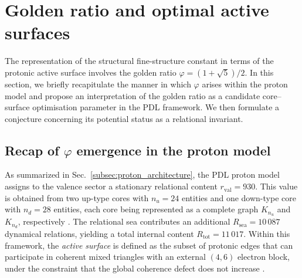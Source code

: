 \documentclass[11pt,a4paper]{article}
\numberwithin{equation}{section}
\begin{document}
\section{Golden ratio and optimal active surfaces}
\label{sec:golden_ratio}

The representation of the structural fine-structure constant in terms of the protonic active surface involves the golden ratio $\varphi=(1+\sqrt{5})/2$. In this section, we briefly recapitulate the manner in which $\varphi$ arises within the proton model and propose an interpretation of the golden ratio as a candidate core–surface optimisation parameter in the PDL framework. We then formulate a conjecture concerning its potential status as a relational invariant.

\subsection{Recap of \texorpdfstring{$\varphi$}{phi} emergence in the proton model}
\label{subsec:phi_recap}

As summarized in Sec.~\ref{subsec:proton_architecture}, the PDL proton model assigns to the valence sector a stationary relational content $r_{\mathrm{val}}=930$. This value is obtained from two up-type cores with $n_u=24$ entities and one down-type core with $n_d=28$ entities, each core being represented as a complete graph $K_{n_u}$ and $K_{n_d}$, respectively \cite{LaubscherPDLFull2026,LaubscherLDP2026,LaubscherCombinatorialProton2026}. The relational sea contributes an additional $R_{\mathrm{sea}}=10\,087$ dynamical relations, yielding a total internal content $R_{\mathrm{tot}}=11\,017$. Within this framework, the \emph{active surface} is defined as the subset of protonic edges that can participate in coherent mixed triangles with an external $(4,6)$ electron block, under the constraint that the global coherence defect does not increase \cite{LaubscherDerivationAlpha2026,LaubscherGoldenRatioPDL2026}.
\end{document}
